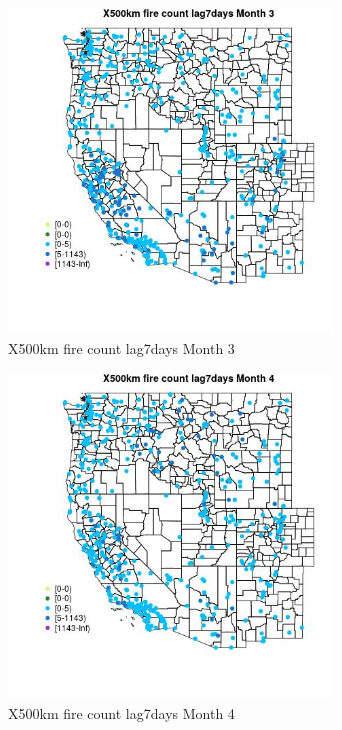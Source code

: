 \begin{figure} 
\centering  
\includegraphics[width=0.77\textwidth]{Code_Outputs/Report_ML_input_PM25_Step4_part_e_de_duplicated_aves_compiled_2019-05-14wNAs_MapObsMo3X500km_fire_count_lag7days.jpg} 
\caption{\label{fig:Report_ML_input_PM25_Step4_part_e_de_duplicated_aves_compiled_2019-05-14wNAsMapObsMo3X500km_fire_count_lag7days}X500km fire count lag7days Month 3} 
\end{figure} 
 

\clearpage 

\begin{figure} 
\centering  
\includegraphics[width=0.77\textwidth]{Code_Outputs/Report_ML_input_PM25_Step4_part_e_de_duplicated_aves_compiled_2019-05-14wNAs_MapObsMo4X500km_fire_count_lag7days.jpg} 
\caption{\label{fig:Report_ML_input_PM25_Step4_part_e_de_duplicated_aves_compiled_2019-05-14wNAsMapObsMo4X500km_fire_count_lag7days}X500km fire count lag7days Month 4} 
\end{figure} 
 

